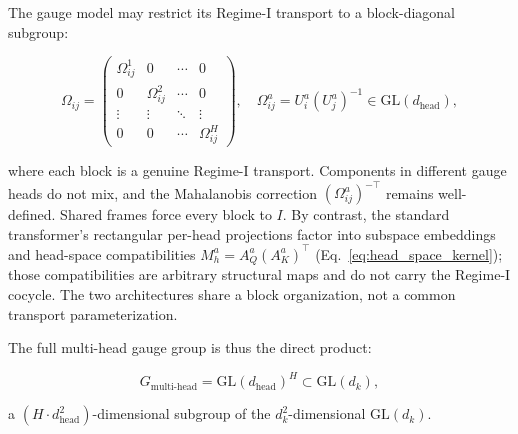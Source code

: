 \documentclass[twoside,11pt]{article}
\begin{document}
The gauge model may restrict its Regime-I transport to a block-diagonal subgroup:

\begin{equation}
\Omega_{ij} = \begin{pmatrix}
\Omega_{ij}^1 & 0 & \cdots & 0 \\
0 & \Omega_{ij}^2 & \cdots & 0 \\
\vdots & \vdots & \ddots & \vdots \\
0 & 0 & \cdots & \Omega_{ij}^H
\end{pmatrix}, \quad \Omega_{ij}^a = U_i^a(U_j^a)^{-1} \in \mathrm{GL}(d_{\text{head}}),
\end{equation}

where each block is a genuine Regime-I transport. Components in different gauge heads do not mix, and the Mahalanobis correction $(\Omega_{ij}^a)^{-\top}$ remains well-defined. Shared frames force every block to $I$. By contrast, the standard transformer's rectangular per-head projections factor into subspace embeddings and head-space compatibilities $M_h^a = A_Q^a(A_K^a)^\top$ (Eq.~\ref{eq:head_space_kernel}); those compatibilities are arbitrary structural maps and do not carry the Regime-I cocycle. The two architectures share a block organization, not a common transport parameterization.

The full multi-head gauge group is thus the direct product:

\begin{equation}
G_{\text{multi-head}} = \mathrm{GL}(d_{\text{head}})^H \subset \mathrm{GL}(d_k),
\end{equation}

a $(H \cdot d_{\text{head}}^2)$-dimensional subgroup of the $d_k^2$-dimensional $\mathrm{GL}(d_k)$.
\end{document}
